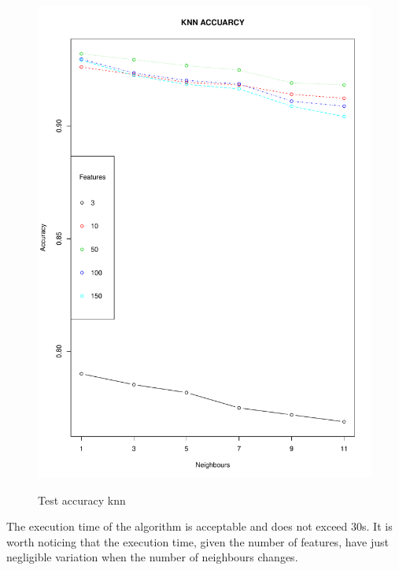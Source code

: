 \documentclass{article}
\begin{document}
\begin{figure}[H]
\begin{adjustwidth}{-4cm}{-4cm}
{    \includegraphics[scale=0.35]{../knn_accuracy_rgb.pdf}  
     }
     \centering
     \caption{Test accuracy knn}  \label{knnaccuracy}
      \end{adjustwidth}
   \end{figure}
   
\noindent The execution time of the algorithm is acceptable and does not exceed 30s. It is worth noticing that the execution time, given the number of features, have just negligible variation when the number of neighbours changes.\\
\end{document}
